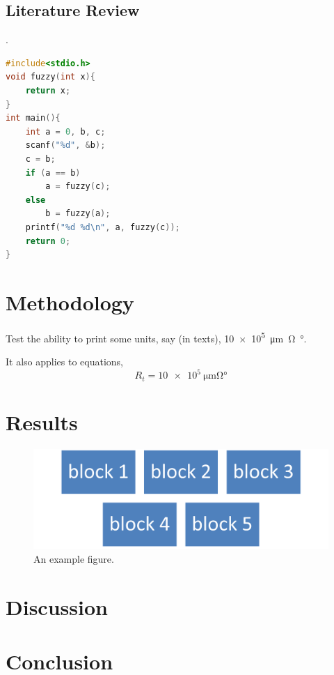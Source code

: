 \documentclass{senior-design}
\begin{document}
\subsection{Literature Review}
\lipsum[2]\cite{j.a.prufrock2009,li1999,ref1}.

\begin{lstlisting}[language=c]
#include<stdio.h>
void fuzzy(int x){
    return x;
}
int main(){
    int a = 0, b, c;
    scanf("%d", &b);
    c = b;
    if (a == b)
        a = fuzzy(c);
    else
        b = fuzzy(a);
    printf("%d %d\n", a, fuzzy(c));
    return 0;
}
\end{lstlisting}

\section{Methodology}

Test the ability to print some units, say (in texts), \SI{10e5}{\um\ohm\degree}.

It also applies to equations,
\begin{equation}
    R_{t}=\SI{10e5}{\um\ohm\degree}
\end{equation}

\section{Results}
\begin{figure}[H]
    \centering
    \includegraphics[width=0.8\linewidth]{figs/Picture1.png}
    \caption{An example figure.}
\end{figure}
\section{Discussion}

\section{Conclusion}


\clearpage
\renewcommand*{\UrlFont}{\rmfamily}
\printbibliography[title={References},heading=bibintoc]
\clearpage
\end{document}
